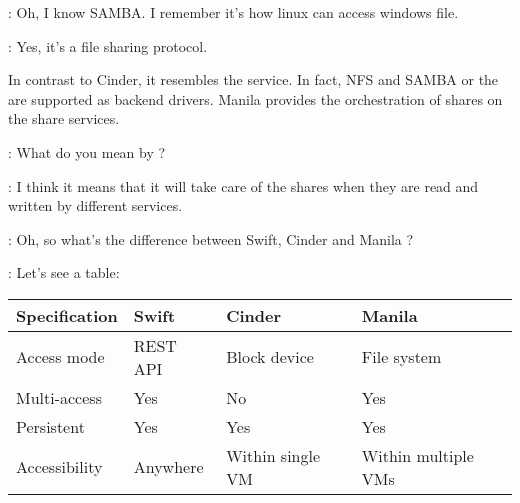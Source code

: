 \documentclass[dvipsnames]{article}
\begin{document}
 : Oh, I know SAMBA. I remember it's how linux can access windows
file.

 : Yes, it's a file sharing protocol.

In contrast to Cinder, it resembles the 
service. In fact, NFS and SAMBA or the 
are supported as backend drivers. Manila provides the orchestration of shares on
the share services.

 : What do you mean by  ?

 : I think it means that it will take care of the shares when they
are read and written by different services.

 : Oh, so what's the difference between Swift, Cinder and Manila ?

 : Let's see a table:

\begin{table}[htbp]
  \centering
  \begin{tabularx}{0.8\textwidth}{XXXX}
    \textbf{Specification} & \textbf{Swift} & Cinder & Manila \\
    \hline
    Access mode & REST API & Block device & File system \\
    Multi-access & Yes & No & Yes \\
    Persistent & Yes & Yes & Yes \\
    Accessibility & Anywhere & Within single VM & Within multiple VMs \\
  \end{tabularx}
\end{table}
\end{document}
